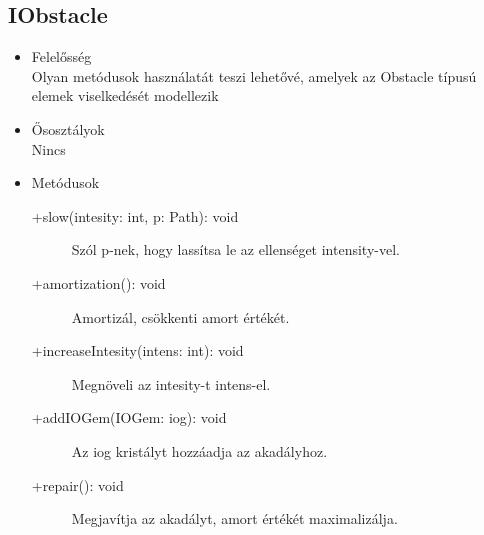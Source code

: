 \subsection{IObstacle}
\begin{itemize}
\item Felelősség\\
Olyan metódusok használatát teszi lehetővé, amelyek az Obstacle típusú elemek viselkedését modellezik
\item Ősosztályok\\
Nincs

\item Metódusok\\
	\begin{description}
		\item[+slow(intesity: int, p: Path): void] Szól p-nek, hogy lassítsa le az ellenséget intensity-vel. 
\item[+amortization(): void] Amortizál, csökkenti amort értékét. 
\item[+increaseIntesity(intens: int): void] Megnöveli az intesity-t intens-el. 
\item[+addIOGem(IOGem: iog): void] Az iog kristályt hozzáadja az akadályhoz. 
\item[+repair(): void] Megjavítja az akadályt, amort értékét maximalizálja. 



		
		
	\end{description}
\end{itemize}
